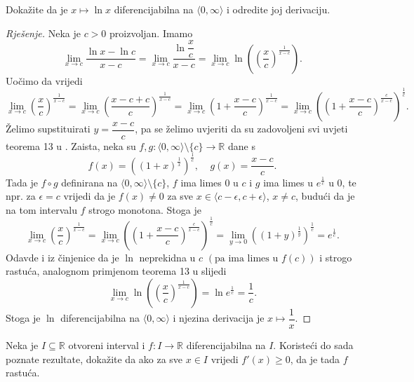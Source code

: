 \begin{exercise}
Dokažite da je $x\mapsto \ln{x}$ diferencijabilna na $\langle 0,\infty\rangle$ i odredite joj derivaciju.
\end{exercise}
\begin{proof}[Rješenje]
Neka je $c>0$ proizvoljan. Imamo
$$\lim\limits_{x\to c}{\dfrac{\ln{x}-\ln{c}}{x-c}}=\lim\limits_{x\to c}{\dfrac{\ln{\dfrac{x}{c}}}{x-c}}=\lim\limits_{x\to c}{\ln\left(\left(\dfrac{x}{c}\right)^\frac{1}{x-c}\right)}.$$
Uočimo da vrijedi
$$\lim\limits_{x\to c}{\left(\dfrac{x}{c}\right)^\frac{1}{x-c}}=\lim\limits_{x\to c}{\left(\dfrac{x-c+c}{c}\right)^\frac{1}{x-c}}=\lim\limits_{x\to c}{\left(1+\dfrac{x-c}{c}\right)^\frac{1}{x-c}}=\lim\limits_{x\to c}{\left(\left(1+\dfrac{x-c}{c}\right)^\frac{c}{x-c}\right)^\frac{1}{c}}.$$
Želimo supstituirati $y=\dfrac{x-c}{c}$, pa se želimo uvjeriti da su zadovoljeni svi uvjeti teorema 13 u \cite{14}. Zaista, neka su $f, g : \langle 0, \infty\rangle\setminus\{c\}\to \mathbb{R}$ dane s 
$$f(x)=\left((1+x)^\frac{1}{x}\right)^\frac{1}{c},\;\;\;\;g(x)=\dfrac{x-c}{c}.$$ 
Tada je $f\circ g$ definirana na $\langle 0, \infty\rangle\setminus\{c\}$, $f$ ima limes $0$ u $c$ i $g$ ima limes u $e^\frac{1}{c}$ u $0$, te npr. za $\epsilon=c$ vrijedi da je $f(x)\neq 0$ za sve $x\in \langle c-\epsilon, c+\epsilon\rangle$, $x\neq c$, budući da je na tom intervalu $f$ strogo monotona. Stoga je
$$\lim\limits_{x\to c}{\left(\dfrac{x}{c}\right)^\frac{1}{x-c}}=\lim\limits_{x\to c}{\left(\left(1+\dfrac{x-c}{c}\right)^\frac{c}{x-c}\right)^\frac{1}{c}}=\lim\limits_{y\to 0}{\left((1+y)^\frac{1}{y}\right)^\frac{1}{c}}=e^\frac{1}{c}.$$
Odavde i iz činjenice da je $\ln$ neprekidna u $c$ $\left(\text{pa ima limes u }f(c)\right)$ i strogo rastuća, analognom primjenom teorema 13 u \cite{14} slijedi
$$\lim\limits_{x\to c}{\ln\left(\left(\dfrac{x}{c}\right)^\frac{1}{x-c}\right)}=\ln{e^\frac{1}{c}}=\dfrac{1}{c}.$$
Stoga je $\ln$ diferencijabilna na $\langle 0, \infty\rangle$ i njezina derivacija je $x\mapsto \dfrac{1}{x}$.
\end{proof}
\begin{exercise}
Neka je $I\subseteq \mathbb{R}$ otvoreni interval i $f : I \to \mathbb{R}$ diferencijabilna na $I$. Koristeći do sada poznate rezultate, dokažite da ako za sve $x\in I$ vrijedi $f'(x)\geq 0$, da je tada $f$ rastuća.
\end{exercise}
